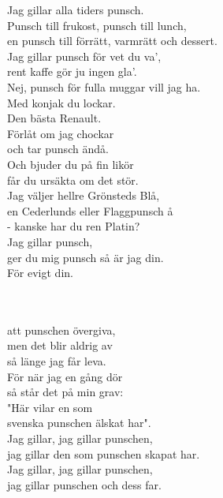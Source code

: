 \songtext{}Jag gillar alla tiders punsch. \\ 
Punsch till frukost, punsch till lunch, \\ 
en punsch till förrätt, varmrätt och dessert. \\ 
Jag gillar punsch för vet du va', \\ 
rent kaffe gör ju ingen gla'. \\ 
Nej, punsch för fulla muggar vill jag ha. \\ 
Med konjak du lockar. \\ 
Den bästa Renault. \\ 
Förlåt om jag chockar \\ 
och tar punsch ändå. \\ 
Och bjuder du på fin likör \\ 
får du ursäkta om det stör. \\ 
Jag väljer hellre Grönsteds Blå, \\ 
en Cederlunds eller Flaggpunsch å \\ 
- kanske har du ren Platin? \\ 
Jag gillar punsch, \\ 
ger du mig punsch så är jag din. \\ 
För evigt din. \\ 

\newpage


\vspace{0.15cm}
\melochtext{} \\
\\ 
att punschen övergiva,\\ 
men det blir aldrig av\\ 
så länge jag får leva.\\ 
För när jag en gång dör\\ 
så står det på min grav:\\ 
"Här vilar en som\\ 
svenska punschen älskat har".\\ 
Jag gillar, jag gillar punschen,\\ 
jag gillar den som punschen skapat har.\\ 
Jag gillar, jag gillar punschen,\\ 
jag gillar punschen och dess far. 

 \\
 
